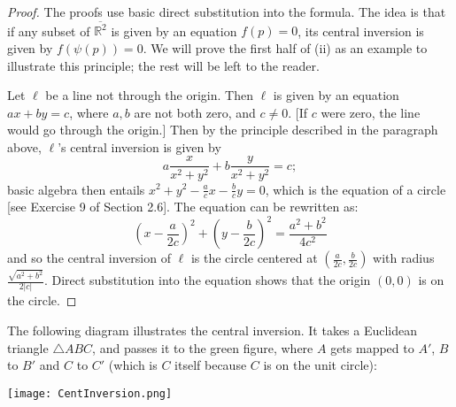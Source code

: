 \documentclass[leqno]{book}
\begin{document}
\begin{proof}
The proofs use basic direct substitution into the formula.  The idea is that if any subset of $\overline{\mathbb R^2}$ is given by an equation $f(p)=0$, its central inversion is given by $f(\psi(p))=0$.  We will prove the first half of (ii) as an example to illustrate this principle; the rest will be left to the reader.

Let $\ell$ be a line not through the origin.  Then $\ell$ is given by an equation $ax+by=c$, where $a,b$ are not both zero, and $c\ne 0$.  [If $c$ were zero, the line would go through the origin.]  Then by the principle described in the paragraph above, $\ell$'s central inversion is given by
$$a\frac x{x^2+y^2}+b\frac y{x^2+y^2}=c;$$
basic algebra then entails $x^2+y^2-\frac acx-\frac bcy=0$, which is the equation of a circle [see Exercise 9 of Section 2.6].  The equation can be rewritten as:
$$\left(x-\frac a{2c}\right)^2+\left(y-\frac b{2c}\right)^2=\frac{a^2+b^2}{4c^2}$$
and so the central inversion of $\ell$ is the circle centered at $\left(\frac a{2c},\frac b{2c}\right)$ with radius $\frac{\sqrt{a^2+b^2}}{2|c|}$.  Direct substitution into the equation shows that the origin $(0,0)$ is on the circle.
\end{proof}

\noindent The following diagram illustrates the central inversion.  It takes a Euclidean triangle $\triangle ABC$, and passes it to the green figure, where $A$ gets mapped to $A'$, $B$ to $B'$ and $C$ to $C'$ (which is $C$ itself because $C$ is on the unit circle):
\begin{center}\texttt{[image: CentInversion.png]}\end{center}
\end{document}
